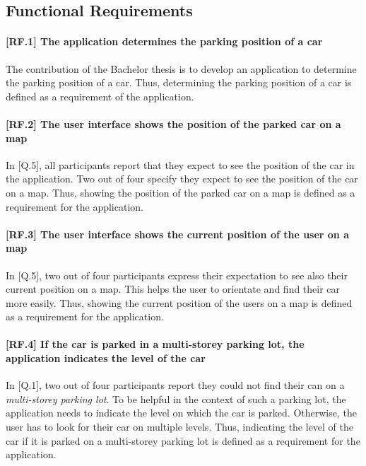 \subsection{Functional Requirements}

\paragraph{[RF.1] The application determines the parking position of a car}
The contribution of the Bachelor thesis is to develop an application to determine the parking position of a car. Thus, determining the parking position of a car is defined as a requirement of the application.

\paragraph{[RF.2] The user interface shows the position of the parked car on a map}
In [Q.5], all participants report that they expect to see the position of the car in the application. Two out of four specify they expect to see the position of the car on a map. Thus, showing the position of the parked car on a map is defined as a requirement for the application. 

\paragraph{[RF.3] The user interface shows the current position of the user on a map}
In [Q.5], two out of four participants express their expectation to see also their current position on a map. This helps the user to orientate and find their car more easily. Thus, showing the current position of the users on a map is defined as a requirement for the application.

\paragraph{[RF.4] If the car is parked in a multi-storey parking lot, the application indicates the level of the car}
In [Q.1], two out of four participants report they could not find their can on a \textit{multi-storey parking lot}. To be helpful in the context of such a parking lot, the application needs to indicate the level on which the car is parked. Otherwise, the user has to look for their car on multiple levels. Thus, indicating the level of the car if it is parked on a multi-storey parking lot is defined as a requirement for the application.

